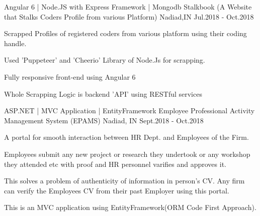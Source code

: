 


\begin{cventries}


\cventry
{Angular 6 | Node.JS with Express Framework | Mongodb} %
{Stalkbook (A Website that Stalks Coders Profile from various Platform)} %
{Nadiad,IN} %
{Jul.2018 - Oct.2018} %
{ %
\begin{cvitems}
\item {Scrapped Profiles of registered coders from various platform using their coding handle.}
\item {Used 'Puppeteer' and 'Cheerio' Library of Node.Js for scrapping.}
\item {Fully responsive front-end using Angular 6}
\item {Whole Scrapping Logic is backend 'API' using RESTful services}
\end{cvitems}
}


\cventry
{ASP.NET | MVC Application | EntityFramework} %
{Employee Professional Activity Management System (EPAMS)} %
{Nadiad, IN} %
{Sept.2018 - Oct.2018} %
{ %
\begin{cvitems}
\item {A portal for smooth interaction between HR Dept. and Employees of the Firm.}
\item {Employees submit any new project or research they undertook or any workshop they attended etc with proof and HR personnel varifies and approves it.}
\item {This solves a problem of authenticity of information in person's CV. Any firm can verify the Employees CV from their past Employer using this portal.}
\item {This is an MVC application using EntityFramework(ORM Code First Approach).}
\end{cvitems}
}


\end{cventries}
